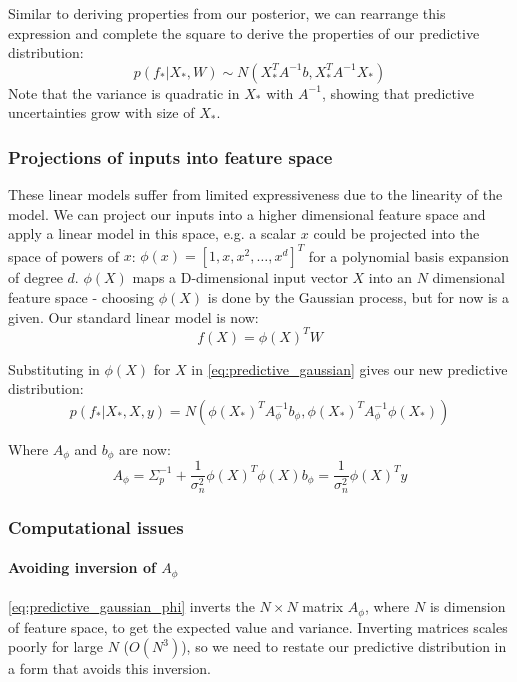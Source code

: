 \documentclass[10pt]{article}
\begin{document}
Similar to deriving properties from our posterior, we can rearrange this expression and complete the square to derive the properties of our predictive distribution:
\begin{equation} \label{eq:predictive_gaussian}
    p(f_*|X_*,W) \sim N(X_*^TA^{-1}b, X_*^TA^{-1}X_*)
\end{equation}
Note that the variance is quadratic in $X_*$ with $A^{-1}$, showing that predictive uncertainties grow with size of $X_*$.

\subsubsection{Projections of inputs into feature space}
These linear models suffer from limited expressiveness due to the linearity of the model. We can project our inputs into a higher dimensional feature space and apply a linear model in this space, e.g. a scalar $x$ could be projected into the space of powers of $x$: $\phi(x) = [1, x, x^2, \ldots, x^d]^T$ for a polynomial basis expansion of degree $d$. $\phi(X)$ maps a D-dimensional input vector $X$ into an $N$ dimensional feature space - choosing $\phi(X)$ is done by the Gaussian process, but for now is a given. Our standard linear model is now:
\begin{equation*}
    f(X) = \phi(X)^T W
\end{equation*}

Substituting in $\phi(X)$ for $X$ in \ref{eq:predictive_gaussian} gives our new predictive distribution:
\begin{equation} \label{eq:predictive_gaussian_phi}
    p(f_*|X_*,X,y) = N(\phi(X_*)^TA_{\phi}^{-1}b_{\phi} , \phi(X_*)^TA_{\phi}^{-1}\phi(X_*))
\end{equation}

Where $A_{\phi}$ and $b_{\phi}$ are now:
\begin{equation*}
    A_{\phi} = \Sigma_p^{-1} + \frac{1}{\sigma^2_n}\phi(X)^T\phi(X)
    b_{\phi} = \frac{1}{\sigma^2_n}\phi(X)^Ty
\end{equation*}

\subsubsection{Computational issues}
\paragraph{Avoiding inversion of $A_{\phi}$}
\ref{eq:predictive_gaussian_phi} inverts the $N \times N$ matrix $A_{\phi}$, where $N$ is dimension of feature space, to get the expected value and variance. Inverting matrices scales poorly for large $N$ ($O(N^3)$), so we need to restate our predictive distribution in a form that avoids this inversion.
\end{document}
